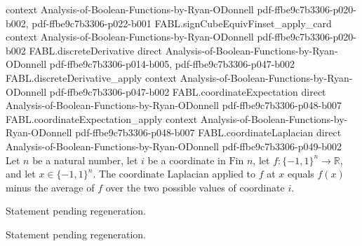 \begin{theorem}
  {context}
  {Analysis-of-Boolean-Functions-by-Ryan-ODonnell}
  {pdf-ffbe9c7b3306-p020-b002,
    pdf-ffbe9c7b3306-p022-b001}
\proofstep
  {FABL.signCubeEquivFinset_apply_card}
  {context}
  {Analysis-of-Boolean-Functions-by-Ryan-ODonnell}
  {pdf-ffbe9c7b3306-p020-b002}
\proofstep
  {FABL.discreteDerivative}
  {direct}
  {Analysis-of-Boolean-Functions-by-Ryan-ODonnell}
  {pdf-ffbe9c7b3306-p014-b005,
    pdf-ffbe9c7b3306-p047-b002}
\proofstep
  {FABL.discreteDerivative_apply}
  {context}
  {Analysis-of-Boolean-Functions-by-Ryan-ODonnell}
  {pdf-ffbe9c7b3306-p047-b002}
\proofstep
  {FABL.coordinateExpectation}
  {direct}
  {Analysis-of-Boolean-Functions-by-Ryan-ODonnell}
  {pdf-ffbe9c7b3306-p048-b007}
\proofstep
  {FABL.coordinateExpectation_apply}
  {context}
  {Analysis-of-Boolean-Functions-by-Ryan-ODonnell}
  {pdf-ffbe9c7b3306-p048-b007}
\proofstep
  {FABL.coordinateLaplacian}
  {direct}
  {Analysis-of-Boolean-Functions-by-Ryan-ODonnell}
  {pdf-ffbe9c7b3306-p049-b002}
Let $n$ be a natural number, let $i$ be a coordinate in $\text{Fin }n$, let
$f:\{−1,1\}^n\to\mathbb R$, and let $x\in\{−1,1\}^n$. The coordinate Laplacian applied
to $f$ at $x$ equals $f(x)$ minus the average of $f$ over the two possible values of
coordinate $i$.
\end{theorem}

\begin{theorem}
\label{FABL.coordinateLaplacian_eq_signValue_mul_discreteDerivative}
\leanok
{}
Statement pending regeneration.
\end{theorem}

\begin{theorem}
\label{FABL.coordinateLaplacian_eq_sub_flip_div_two}
\leanok
{}
Statement pending regeneration.
\end{theorem}

